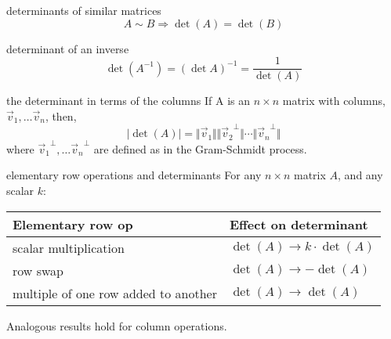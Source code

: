 \documentclass[avery5371,grid,letterpaper]{flashcards}
\begin{document}
\begin{flashcard}[Theorem]{determinants of similar matrices}
\begin{displaymath}
A \sim B \Rightarrow \det(A) = \det(B)
\end{displaymath}
\end{flashcard}

\begin{flashcard}[Theorem]{determinant of an inverse}
\begin{displaymath}
\det(A^{-1}) = (\det A)^{-1} = \frac{1}{\det(A)}
\end{displaymath}
\end{flashcard}

\begin{flashcard}[Theorem]{the determinant in terms of the columns}
If A is an $n \times n$ matrix with columns, $\vec{v}_1, \ldots \vec{v}_n$, then,
\begin{displaymath}
\vert \det(A) \vert =
\Vert \vec{v}_1 \Vert
\Vert {\vec{v}_2}^{\bot} \Vert
\cdots
\Vert {\vec{v}_n}^{\bot} \Vert
\end{displaymath}
where ${\vec{v}_1}^{\bot}, \ldots {\vec{v}_n}^{\bot}$ are defined as in the Gram-Schmidt process.
\end{flashcard}

\begin{flashcard}[Theorem]{elementary row operations and determinants}
For any $n \times n$ matrix $A$, and any scalar $k$:
\smallskip
\begin{small}
\begin{center}
\begin{tabular}{|p{3cm}|l|}
\hline
Elementary row op & Effect on determinant \\
\hline
scalar multiplication & $\det(A) \rightarrow k \cdot \det(A)$ \\
\hline
row swap & $\det(A) \rightarrow -\det(A)$ \\
\hline
multiple of one row added to another & $\det(A) \rightarrow \det(A)$ \\
\hline
\end{tabular}
\end{center}
\end{small}
\smallskip
Analogous results hold for column operations.
\end{flashcard}
\end{document}
